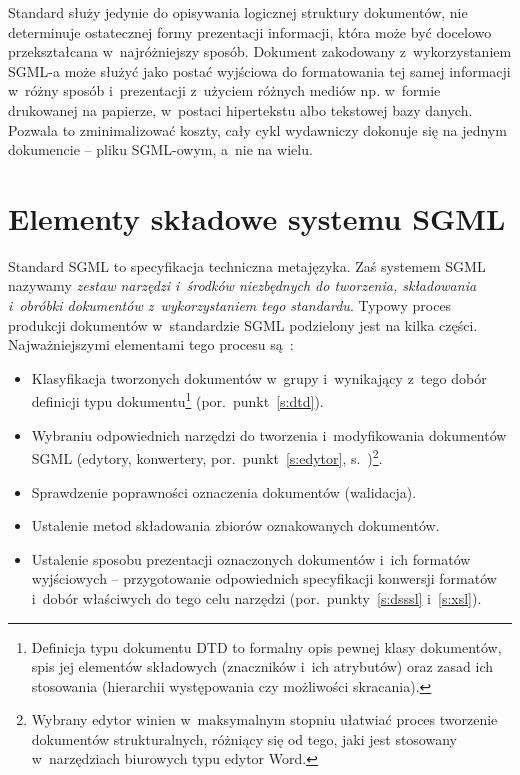 \documentclass[brudnopis]{xmgr}
\begin{document}
Standard służy jedynie do opisywania logicznej struktury dokumentów,
nie determinuje ostatecznej formy prezentacji informacji, która może
być docelowo przekształcana w~najróżniejszy sposób. Dokument
zakodowany z~wykorzystaniem SGML-a może służyć jako postać wyjściowa
do formatowania tej samej informacji w~różny sposób i~prezentacji
z~użyciem różnych mediów np. w~formie drukowanej na papierze,
w~postaci hipertekstu albo tekstowej bazy danych. Pozwala to
zminimalizować koszty, cały cykl wydawniczy dokonuje się
na jednym dokumencie -- pliku SGML-owym, a~nie na wielu.
    
\section{Elementy składowe systemu SGML}

Standard SGML to specyfikacja techniczna metajęzyka. Zaś systemem
SGML nazywamy \emph{zestaw narzędzi i~środków niezbędnych do
tworzenia, składowania i~obróbki dokumentów z~wykorzystaniem tego
standardu}.  Typowy proces produkcji dokumentów w~standardzie SGML
podzielony jest na kilka części. Najważniejszymi elementami tego
procesu są~\cite[s.~45--47]{Eisenberg:2002:SXM}:
    
\begin{itemize}
\item Klasyfikacja tworzonych dokumentów w~grupy i~wynikający z~tego
  dobór definicji typu dokumentu\footnote{Definicja typu dokumentu DTD
    to formalny opis pewnej klasy dokumentów, spis jej elementów
    składowych (znaczników i~ich atrybutów) oraz zasad ich stosowania
    (hierarchii występowania czy możliwości skracania).}
  (por.~punkt~\ref{s:dtd}).
\item Wybraniu odpowiednich narzędzi do tworzenia i~modyfikowania
  dokumentów SGML (edytory, konwertery, por.~punkt~\ref{s:edytor},
  s.~\pageref{s:edytor})\footnote{Wybrany edytor winien w~maksymalnym
    stopniu ułatwiać proces tworzenie dokumentów strukturalnych,
    różniący się od tego, jaki jest stosowany w~narzędziach biurowych
    typu edytor Word.}.
\item Sprawdzenie poprawności oznaczenia dokumentów
  (walidacja).
\item Ustalenie metod składowania zbiorów oznakowanych dokumentów.
\item Ustalenie sposobu prezentacji oznaczonych dokumentów i~ich
  formatów wyjściowych -- przygotowanie odpowiednich specyfikacji
  konwersji formatów i~dobór właściwych do tego celu narzędzi
  (por.~punkty~\ref{s:dsssl} i~\ref{s:xsl}).
\end{itemize}
\end{document}
